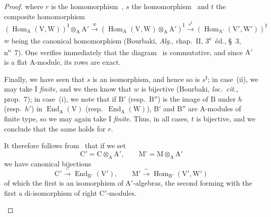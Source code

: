 \begin{proof}
where $r$ is the homomorphism~, $s$ the
homomorphism~ and $t$ the composite homomorphism
\[
  (\operatorname{Hom}_{\mathrm{A}}(\mathrm{V},\mathrm{W}))^{\mathrm{I}}\otimes_{\mathrm{A}}\mathrm{A}' \xrightarrow{w} (\operatorname{Hom}_{\mathrm{A}}(\mathrm{V},\mathrm{W})\otimes_{\mathrm{A}}\mathrm{A}')^{\mathrm{I}} \xrightarrow{s^{\mathrm{I}}} (\operatorname{Hom}_{\mathrm{A}'}(\mathrm{V}',\mathrm{W}'))^{\mathrm{I}}
\]
$w$ being the canonical homomorphism (Bourbaki, \emph{Alg.},
chap.~II, 3\textsuperscript{e}~\'{e}d., \S~3, n\textsuperscript{o}~7). One verifies
immediately that the diagram~ is commutative, and since
$\mathrm{A}'$ is a flat $\mathrm{A}$-module, its rows are exact.


Finally, we have seen that $s$ is an isomorphism, and hence so is
$s^{\mathrm{I}}$; in case~(ii), we may take $\mathrm{I}$ \emph{finite}, and we
then know that $w$ is bijective (Bourbaki, \emph{loc.\ cit.}, prop.~7); in
case~(i), we note that if $\mathrm{B}'$
\textnormal{(}resp.\ $\mathrm{B}''$\textnormal{)} is the image of
$\mathrm{B}$ under $h$ \textnormal{(}resp.\ $h'$\textnormal{)} in
$\operatorname{End}_{\mathrm{A}}(\mathrm{V})$
\textnormal{(}resp.\
$\operatorname{End}_{\mathrm{A}}(\mathrm{W})$\textnormal{)}, $\mathrm{B}'$
and $\mathrm{B}''$ are $\mathrm{A}$-modules of finite type, so we may again
take $\mathrm{I}$ \emph{finite}. Thus, in all cases, $t$ is bijective, and we
conclude that the same holds for $r$.

\begin{env}[2.5.8.6]
\label{IV.2.5.8.6}
It therefore follows from~ that if we set
\[
  \mathrm{C}'=\mathrm{C}\otimes_{\mathrm{A}}\mathrm{A}',\qquad \mathrm{M}'=\mathrm{M}\otimes_{\mathrm{A}}\mathrm{A}'
\]
we have canonical bijections
\[
  \mathrm{C}' \xrightarrow{\;\sim\;} \operatorname{End}_{\mathrm{B}'}(\mathrm{V}'),\qquad \mathrm{M}' \xrightarrow{\;\sim\;} \operatorname{Hom}_{\mathrm{B}'}(\mathrm{V}',\mathrm{W}')
\]
of which the first is an isomorphism of $\mathrm{A}'$-algebras, the second
forming with the first a di-isomorphism of right $\mathrm{C}'$-modules.
\end{env}


\end{proof}
